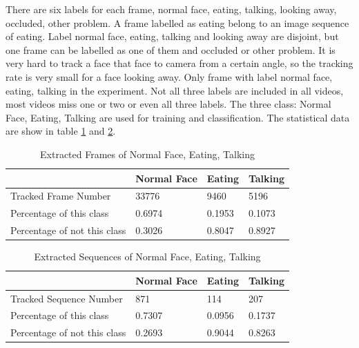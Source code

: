 \newline
There are six labels for each frame, normal face, eating, talking, looking away, occluded, other problem. A frame labelled as eating belong to an image sequence of eating. Label normal face, eating, talking and looking away are disjoint, but one frame can be labelled as one of them and occluded or other problem. It is very hard to track a face that face to camera from a certain angle, so the tracking rate is very small for a face looking away. Only frame with label normal face, eating, talking in the experiment. Not all three labels are included in all videos, most videos miss one or two or even all three labels.
\newline
The three class: Normal Face, Eating, Talking are used for training and classification. The statistical data are show in table \ref{tab:UFD} and \ref{tab:USD}.
\begin{table}[ht]
\centering
\begin{tabular}{l|l|l|l|}
\cline{2-4}
                                                   & Normal Face & Eating & Talking \\ \hline
\multicolumn{1}{|l|}{Tracked Frame Number}         & 33776       & 9460   & 5196    \\ \hline
\multicolumn{1}{|l|}{Percentage of this class}     & 0.6974      & 0.1953 & 0.1073  \\ \hline
\multicolumn{1}{|l|}{Percentage of not this class} & 0.3026      & 0.8047 & 0.8927  \\ \hline
\end{tabular}
\caption{Extracted Frames of Normal Face, Eating, Talking}
\label{tab:UFD}
\end{table}
\begin{table}[ht]
\centering
\begin{tabular}{l|l|l|l|}
\cline{2-4}
                                                   & Normal Face & Eating & Talking \\ \hline
\multicolumn{1}{|l|}{Tracked Sequence Number}      & 871         & 114    & 207     \\ \hline
\multicolumn{1}{|l|}{Percentage of this class}     & 0.7307      & 0.0956 & 0.1737  \\ \hline
\multicolumn{1}{|l|}{Percentage of not this class} & 0.2693      & 0.9044 & 0.8263  \\ \hline
\end{tabular}
\caption{Extracted Sequences of Normal Face, Eating, Talking}
\label{tab:USD}
\end{table}
